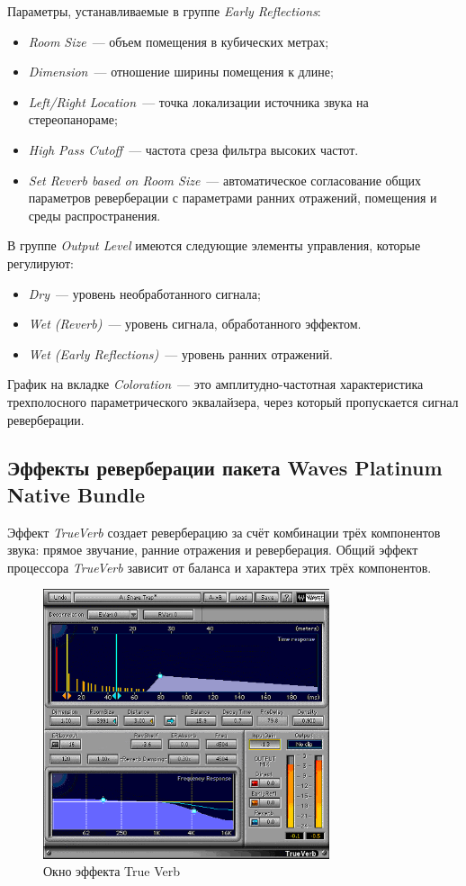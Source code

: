 \documentclass[oneside, final, 14pt]{extreport}
\begin{document}
Параметры, устанавливаемые в группе \emph{Early Reflections}:
\begin{itemize}
  \item \emph{Room Size}~--- объем помещения в кубических метрах;
  \item \emph{Dimension}~--- отношение ширины помещения к длине;
  \item \emph{Left/Right Location}~--- точка локализации источника звука на стереопанораме;
  \item \emph{High Pass Cutoff}~--- частота среза фильтра высоких частот.
  \item \emph{Set Reverb based on Room Size}~--- автоматическое согласование общих параметров реверберации с параметрами ранних отражений, помещения и среды распространения.
\end{itemize}

В группе \emph{Output Level} имеются следующие элементы управления, которые регулируют:
\begin{itemize}
  \item \emph{Dry}~--- уровень необработанного сигнала;
  \item \emph{Wet (Reverb)}~--- уровень сигнала, обработанного эффектом.
  \item \emph{Wet (Early Reflections)}~--- уровень ранних отражений.
\end{itemize}

График на вкладке \emph{Coloration}~--- это амплитудно-частотная характеристика трехполосного параметрического эквалайзера, через который пропускается сигнал реверберации.

\subsection{Эффекты реверберации пакета Waves Platinum Native Bundle}
Эффект \emph{TrueVerb} создает реверберацию за счёт комбинации трёх компонентов звука: прямое звучание, ранние отражения и реверберация. Общий эффект процессора \emph{TrueVerb} зависит от баланса и характера этих трёх компонентов.

\begin{figure}[h!]
  \centering
  \includegraphics[width=0.75\textwidth]{pic-wavestrueverb-01}
  \caption{Окно эффекта True Verb}
  \label{pic-wavestrueverb-01}
\end{figure}
\end{document}
